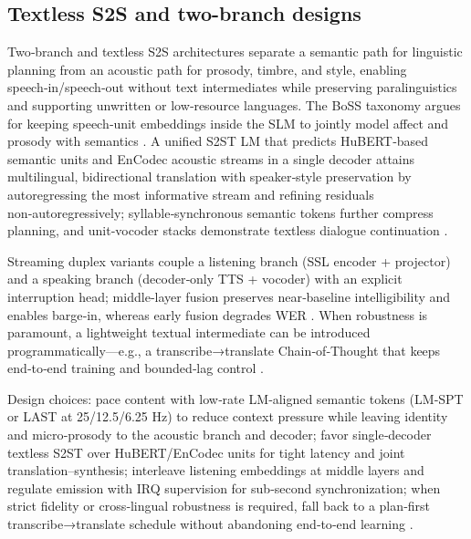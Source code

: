 \subsection{Textless S2S and two-branch designs} \label{subsec:Textless S2S and two-branch designs}
Two‑branch and textless S2S architectures separate a semantic path for linguistic planning from an acoustic path for prosody, timbre, and style, enabling speech‑in/speech‑out without text intermediates while preserving paralinguistics and supporting unwritten or low‑resource languages. The BoSS taxonomy argues for keeping speech‑unit embeddings inside the SLM to jointly model affect and prosody with semantics \cite{wang2025bossbeyondsemanticspeech}. A unified S2ST LM that predicts HuBERT‑based semantic units and EnCodec acoustic streams in a single decoder attains multilingual, bidirectional translation with speaker‑style preservation by autoregressing the most informative stream and refining residuals non‑autoregressively; syllable‑synchronous semantic tokens further compress planning, and unit‑vocoder stacks demonstrate textless dialogue continuation \cite{peng2024mslms2stmultitaskspeechlanguagemodeltext,baade2024syllablelmlearningcoarsesemanticunitsspe,nakata2024jchatjapaneselargescalespokendialoguecor}.

Streaming duplex variants couple a listening branch (SSL encoder + projector) and a speaking branch (decoder‑only TTS + vocoder) with an explicit interruption head; middle‑layer fusion preserves near‑baseline intelligibility and enables barge‑in, whereas early fusion degrades WER \cite{ma2024languagemodelcanlistenwhilespeaking}. When robustness is paramount, a lightweight textual intermediate can be introduced programmatically—e.g., a transcribe→translate Chain‑of‑Thought that keeps end‑to‑end training and bounded‑lag control \cite{guo2025streamuniachievingstreamingspeechtransla}.

Design choices: pace content with low‑rate LM‑aligned semantic tokens (LM‑SPT or LAST at 25/12.5/6.25 Hz) to reduce context pressure while leaving identity and micro‑prosody to the acoustic branch and decoder; favor single‑decoder textless S2ST over HuBERT/EnCodec units for tight latency and joint translation–synthesis; interleave listening embeddings at middle layers and regulate emission with IRQ supervision for sub‑second synchronization; when strict fidelity or cross‑lingual robustness is required, fall back to a plan‑first transcribe→translate schedule without abandoning end‑to‑end learning \cite{jo2025lmsptalignedsemanticdistillationspeechto,turetzky2024lastlanguagemodelawarespeechtokenization,entry2025towardjointlanguagemodelingspeechunitste,ma2024languagemodelcanlistenwhilespeaking,guo2025streamuniachievingstreamingspeechtransla,qian2025prosodylmuncoveringemergingprosodyproces}.

















